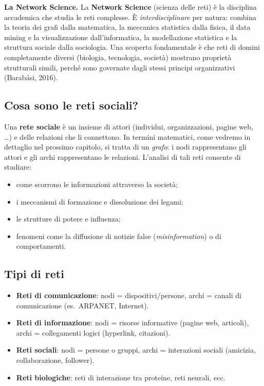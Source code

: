 \documentclass[12pt,a4paper]{article}
\begin{document}
\medskip
\noindent\textbf{La Network Science.}
La \textbf{Network Science} (scienza delle reti) è la disciplina accademica che studia
le reti complesse. È \emph{interdisciplinare} per natura: combina la teoria dei grafi
dalla matematica, la meccanica statistica dalla fisica, il data mining e la visualizzazione
dall'informatica, la modellazione statistica e la struttura sociale dalla sociologia.
Una scoperta fondamentale è che reti di domini completamente diversi (biologia, tecnologia,
società) mostrano proprietà strutturali simili, perché sono governate dagli stessi
principi organizzativi (Barabási, 2016).

\subsection{Cosa sono le reti sociali?}

Una \textbf{rete sociale} è un insieme di attori (individui, organizzazioni, pagine web, \ldots)
e delle relazioni che li connettono. In termini matematici, come vedremo in dettaglio nel
prossimo capitolo, si tratta di un \emph{grafo}: i nodi rappresentano gli attori e gli archi
rappresentano le relazioni. L'analisi di tali reti consente di studiare:
\begin{itemize}
  \item come scorrono le informazioni attraverso la società;
  \item i meccanismi di formazione e dissoluzione dei legami;
  \item le strutture di potere e influenza;
  \item fenomeni come la diffusione di notizie false (\textit{misinformation}) o di comportamenti.
\end{itemize}

\subsection{Tipi di reti}

\begin{itemize}
  \item \textbf{Reti di comunicazione}: nodi = dispositivi/persone, archi = canali di comunicazione
        (es.\ ARPANET, Internet).
  \item \textbf{Reti di informazione}: nodi = risorse informative (pagine web, articoli),
        archi = collegamenti logici (hyperlink, citazioni).
  \item \textbf{Reti sociali}: nodi = persone o gruppi, archi = interazioni sociali
        (amicizia, collaborazione, follower).
  \item \textbf{Reti biologiche}: reti di interazione tra proteine, reti neurali, ecc.
\end{itemize}
\end{document}

